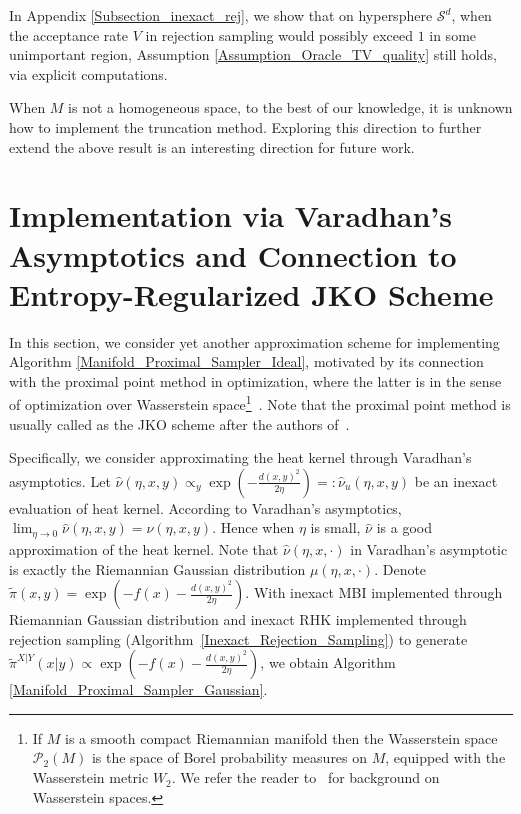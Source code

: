\begin{remark} 
In Appendix \ref{Subsection_inexact_rej}, we show that on hypersphere $\mathcal{S}^{d}$, when the acceptance rate $V$ in rejection sampling would possibly exceed $1$ in some unimportant region, Assumption \ref{Assumption_Oracle_TV_quality} still holds, via explicit computations.
\end{remark}

When $M$ is not a homogeneous space, to the best of our knowledge, it is unknown how to implement the truncation method. Exploring this direction to further extend the above result is an interesting direction for future work.




\section{Implementation via Varadhan's Asymptotics and Connection to Entropy-Regularized JKO Scheme}\label{Section_Proximal_point_approximation}

In this section, we consider yet another approximation scheme for implementing Algorithm \ref{Manifold_Proximal_Sampler_Ideal}, motivated by its connection with the proximal point method in optimization, where the latter is in the sense of optimization over Wasserstein space\footnote{If $M$ is a smooth compact Riemannian manifold then the Wasserstein space $\mathcal{P}_2(M)$ is the
space of Borel probability measures on $M$, equipped with the Wasserstein metric $W_2$.  We refer the reader to~\cite{villani2021topics} for background on Wasserstein spaces.}~\citep{jordan1998variational,wibisono2018sampling,chen2022improved}. Note that the proximal point method is usually called as the JKO scheme after the authors of~\cite{jordan1998variational}. 


Specifically, we consider approximating the heat kernel through Varadhan's asymptotics. 
Let $\hat{\nu}(\eta, x, y) \propto_{y} \exp(-\frac{d(x, y)^2}{2\eta}) =: \hat{\nu}_{u}(\eta, x, y)$ be an inexact evaluation of heat kernel. 
According to Varadhan's asymptotics, $\lim_{\eta \to 0} \hat{\nu}(\eta, x, y) = \nu(\eta, x, y)$. 
Hence when $\eta$ is small, $\hat{\nu}$ is a good approximation of the heat kernel. 
Note that $\hat{\nu}(\eta, x, \cdot)$ in Varadhan's asymptotic is exactly the Riemannian Gaussian distribution $\mu(\eta, x, \cdot)$. Denote $\tilde{\pi}(x, y) = \exp(-f(x)-\frac{d(x, y)^2}{2\eta})$. 
With inexact MBI implemented through Riemannian Gaussian distribution and  inexact RHK implemented through rejection sampling (Algorithm~\ref{Inexact_Rejection_Sampling}) to generate $\tilde{\pi}^{X|Y}(x|y) \propto \exp(-f(x) - \frac{d(x, y)^{2}}{2\eta})$,
we obtain Algorithm \ref{Manifold_Proximal_Sampler_Gaussian}.


